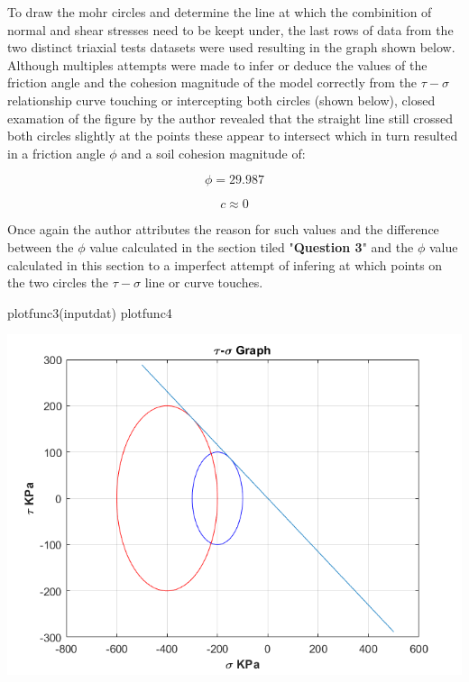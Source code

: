 \documentclass{article}
\begin{document}
\begin{par}
\begin{flushleft}
To draw the mohr circles and determine the line at which the combinition of normal and shear stresses need to be keept under, the last rows of data from the two distinct triaxial tests datasets were used resulting in the graph shown below. Although multiples attempts were made to infer or deduce the values of the friction angle and the cohesion magnitude of the model correctly from the $\tau-\sigma$ relationship curve touching or intercepting both circles (shown below), closed examation of the figure by the author revealed that the straight line still crossed both circles slightly at the points these appear to intersect which in turn resulted in a friction angle $\phi$ and a soil cohesion magnitude of:
\end{flushleft}
\end{par}

\begin{par}
$$\phi=29.987$$
\end{par}
\begin{par}
$$c\approx0$$
\end{par}

\begin{par}
\begin{flushleft}
Once again the author attributes the reason for such values and the difference between the $\phi$ value calculated in the section tiled "\textbf{Question 3}" and the $\phi$ value calculated in this section to a imperfect attempt of infering at which points on the two circles the $\tau-\sigma$ line or curve touches. 
\end{flushleft}
\end{par}

\begin{matlabcode}
plotfunc3(inputdat)
plotfunc4
\end{matlabcode}
\begin{center}
\includegraphics[width=14.5cm]{figure_2}
\end{center}
\end{document}
